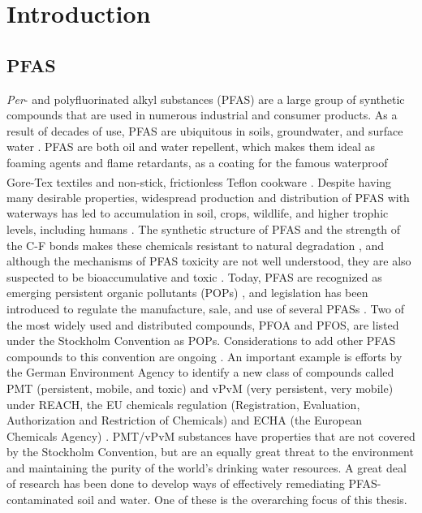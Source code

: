 \chapter{Introduction}\label{chap:intro}

\section{PFAS}
\textit{Per}- and polyfluorinated alkyl substances (PFAS) are a large group of synthetic compounds that are used in numerous industrial and consumer products. As a result of decades of use, PFAS are ubiquitous in soils, groundwater, and surface water \citep{rankin2016north}. PFAS are both oil and water repellent, which makes them ideal as foaming agents and flame retardants, as a coating for the famous waterproof Gore-Tex\textsuperscript{\textregistered} textiles and non-stick, frictionless Teflon\textsuperscript{\texttrademark} cookware \citep{du2014adsorption}. Despite having many desirable properties, widespread production and distribution of PFAS with waterways has led to accumulation in soil, crops, wildlife, and higher trophic levels, including humans \citep{bhhatarai2011,Lau2007}. The synthetic structure of PFAS and the strength of the C-F bonds makes these chemicals resistant to natural degradation \citep{krafft2015per}, and although the mechanisms of PFAS toxicity are not well understood, they are also suspected to be bioaccumulative and toxic \citep{ding2013physicochemical,Lau2007}. Today, PFAS are recognized as emerging persistent organic pollutants (POPs) \citep{ECHA2020}, and legislation has been introduced to regulate the manufacture, sale, and use of several PFASs \citep{EPA2014,EC2020PFAS,goldenman2017study}. Two of the most widely used and distributed compounds, PFOA and PFOS, are listed under the Stockholm Convention as POPs. Considerations to add other PFAS compounds to this convention are ongoing \citep{EC2020PFAS}. An important example is efforts by the German Environment Agency to identify a new class of compounds called PMT (persistent, mobile, and toxic) and vPvM (very persistent, very mobile) under REACH, the EU chemicals regulation (Registration, Evaluation, Authorization and Restriction of Chemicals) and ECHA (the European Chemicals Agency) \citep{hale2020persistent}. PMT/vPvM substances have properties that are not covered by the Stockholm Convention, but are an equally great threat to the environment and maintaining the purity of the world's drinking water resources. A great deal of research has been done to develop ways of effectively remediating PFAS-contaminated soil and water. One of these is the overarching focus of this thesis. 

